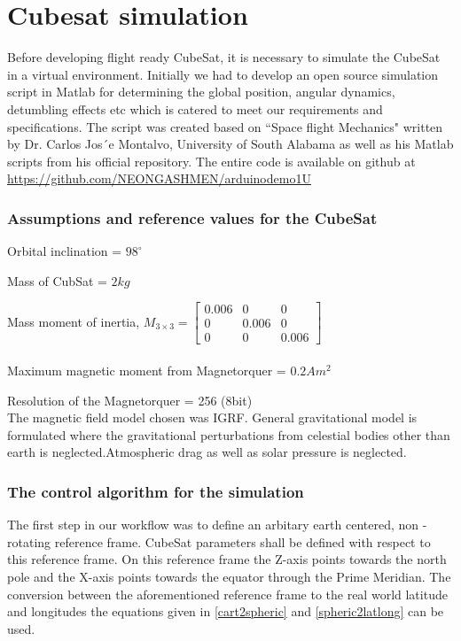 \chapter{Cubesat simulation}

Before developing flight ready CubeSat, it is necessary to simulate the CubeSat in a virtual environment. Initially we had to develop an open source simulation script in Matlab for determining the global position, angular dynamics, detumbling effects etc which is catered to meet our requirements and specifications. The script was created based on ``Space flight Mechanics" written by Dr. Carlos Jos´e Montalvo, University of South Alabama as well as his Matlab scripts from his official repository. The entire code is available on github at \url{https://github.com/NEONGASHMEN/arduinodemo1U}

\subsection{Assumptions and reference values for the CubeSat}

\vspace{15pt}
\noindent Orbital inclination = $98^{\circ}$

\noindent Mass of CubSat = $2kg$

\noindent Mass moment of inertia, $M_{3\times3} = $\(\begin{bmatrix}0.006 & 0 & 0\\0 & 0.006 & 0\\0 & 0 & 0.006\end{bmatrix}\) \\\\

\noindent Maximum magnetic moment from Magnetorquer = $0.2Am^2$

\noindent Resolution of the Magnetorquer = 256 (8bit)\\

The magnetic field model chosen was IGRF. General gravitational model is formulated where the gravitational perturbations from celestial bodies other than earth is neglected.Atmospheric drag as well as solar pressure is neglected.\\

\subsection{The control algorithm for the simulation}

The first step in our workflow was to define an arbitary earth centered, non - rotating reference frame. CubeSat parameters shall be defined with respect to this reference frame. On this reference frame the Z-axis points towards the north pole and the X-axis points towards the equator through the Prime Meridian. The conversion between the aforementioned reference frame to the real world latitude and longitudes the equations given in \ref{cart2spheric} and \ref{spheric2latlong} can be used.

